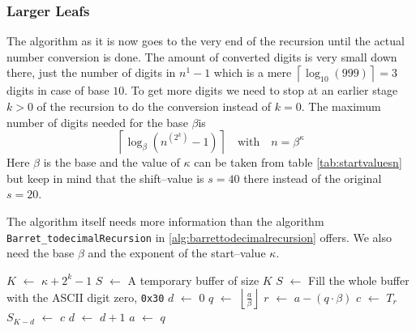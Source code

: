 \documentclass[a4paper,10pt]{article}
\newcommand*\Let[2]{\State #1 $\gets$ #2}
\providecommand{\floor}[1]{\left\lfloor#1\right\rfloor}
\providecommand{\ceil}[1]{\left\lceil#1\right\rceil}
\theoremstyle{plain} %
\theoremstyle{definition}
\theoremstyle{remark}
\newcommand*{\smalltt}[1]{\small\texttt{#1}}
\begin{document}
\subsubsection{Larger Leafs}
The algorithm as it is now goes to the very end of the recursion until the actual number conversion is done. The amount of converted digits is very small down there, just the number of digits in $n^1-1$ which is a mere $\ceil{\log_{10}(999)} = 3$ digits in case of base $10$.
To get more digits we need to stop at an earlier stage $k > 0$ of the recursion to do the conversion instead of $k = 0$. The maximum number of digits needed for the base $\beta$is
\begin{equation}
\ceil{\log_\beta\left(n^{\left(2^k\right)}-1\right)}\quad\text{with}\quad n = \beta^\kappa
\end{equation}
Here $\beta$ is the base and the value of $\kappa$ can be taken from table \ref{tab:startvaluesn} but keep in mind that the shift--value is $s = 40$ there instead of the original $s = 20$.

The algorithm itself needs more information than the algorithm \smalltt{Barret\_todecimalRecursion} in \ref{alg:barrettodecimalrecursion} offers. We also need the base $\beta$ and the exponent of the start--value $\kappa$.

\begin{center}
\begin{minipage}{.9\linewidth}
  \begin{algorithmic}[1]
    \Let{$K$}{$\kappa + 2^k - 1$}
    \Let{$S$}{A temporary buffer of size $K$}
    \Let{$S$}{Fill the whole buffer with the ASCII digit zero, \smalltt{0x30}}
    \Let{$d$}{$0$}
       \Let{$q$}{$\floor{\frac{a}{\beta}}$} 
       \Let{$r$}{$a - \left(q \cdot \beta\right)$}
       \Let{$c$}{$T_r$}
       \Let{$S_{K-d}$}{$c$}
       \Let{$d$}{$d + 1$}
       \Let{$a$}{$q$}
    \EndWhile
    \EndFunction
  \end{algorithmic}
\end{minipage}
\end{center}
\end{document}
